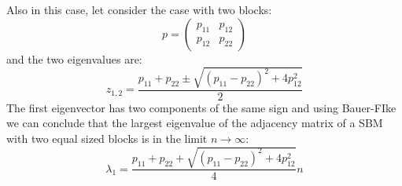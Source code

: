 Also in this case, let consider the case with two blocks:
\[
p = \begin{pmatrix}
	p_{11} & p_{12}\\
	p_{12} & p_{22}
\end{pmatrix}
\]
and the two eigenvalues are:
\[
z_{1,2} = \frac{p_{11} + p_{22} \pm \sqrt{(p_{11} - p_{22})^2 + 4p^2_{12}}}{2}
\]
The first eigenvector has two components of the same sign and using Bauer-FIke we can conclude that the largest eigenvalue of the adjacency matrix of a SBM with two equal sized blocks is in the limit $n \to \infty$:
\[
\lambda_1 = \frac{p_{11} + p_{22} + \sqrt{(p_{11} - p_{22})^2 + 4 p_{12}^2}}{4}n
\]
